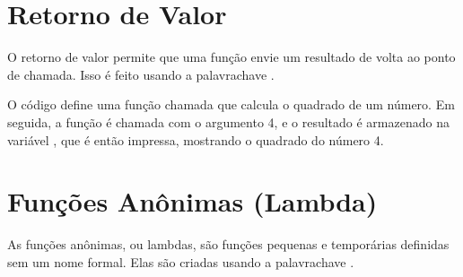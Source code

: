 \documentclass[letterpaper,10pt,english]{jupyterBook}
\begin{document}
\section{Retorno de Valor}
\label{\detokenize{chapters/ch5/ch5:retorno-de-valor}}
\sphinxAtStartPar
O retorno de valor permite que uma função envie um resultado de volta ao ponto de chamada. Isso é feito usando a palavra\sphinxhyphen{}chave .

\sphinxAtStartPar
{}

\begin{sphinxVerbatim}[commandchars=\\\{\}]
 
       

  
\end{sphinxVerbatim}

\begin{sphinxVerbatim}[commandchars=\\\{\}]
   
\end{sphinxVerbatim}

\sphinxAtStartPar
O código define uma função chamada  que calcula o quadrado de um número. Em seguida, a função é chamada com o argumento 4, e o resultado é armazenado na variável , que é então impressa, mostrando o quadrado do número 4.


\section{Funções Anônimas (Lambda)}
\label{\detokenize{chapters/ch5/ch5:funcoes-anonimas-lambda}}
\sphinxAtStartPar
As funções anônimas, ou lambdas, são funções pequenas e temporárias definidas sem um nome formal. Elas são criadas usando a palavra\sphinxhyphen{}chave .
\end{document}

